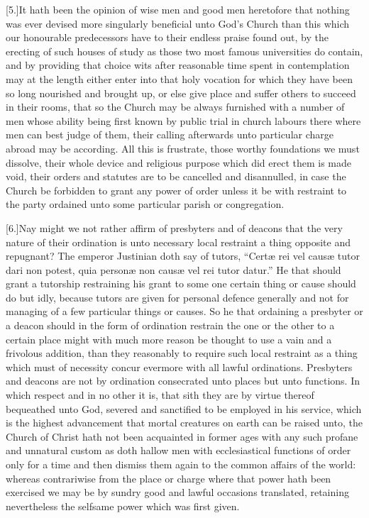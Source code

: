 [5.]It hath been the opinion of wise men and good men heretofore that nothing was ever devised more singularly beneficial unto God’s Church than this which our honourable predecessors have to their endless praise found out, by the erecting of such houses of study as those two most famous universities do contain, and by providing that choice wits after reasonable time spent in contemplation may at the length either enter into that holy vocation for which they have been so long nourished and brought up, or else give place and suffer others to succeed in their rooms, that so the Church may be always furnished with a number of men whose ability being first known by public trial in church labours there where men can best judge of them, their calling afterwards unto particular charge abroad may be according. All this is frustrate, those worthy foundations we must dissolve, their whole device and religious purpose which did erect them is made void, their orders and statutes are to be cancelled and disannulled, in case the Church be forbidden to grant any power of order unless it be with restraint to the party ordained unto some particular parish or congregation.

[6.]Nay might we not rather affirm of presbyters and of deacons that the very nature of their ordination is unto necessary local restraint a thing opposite and repugnant? The emperor Justinian doth say of tutors, “Certæ rei vel causæ tutor dari non potest, quia personæ non causæ vel rei tutor datur.” He that should grant a tutorship restraining his grant to some one certain thing or cause should do  but idly,
 because tutors are given for personal defence generally and not for managing of a few particular things or causes. So he that ordaining a presbyter or a deacon should in the form of ordination restrain the one or the other to a certain place might with much more reason be thought to use a vain and a frivolous addition, than they reasonably to require such local restraint as a thing which must of necessity concur evermore with all lawful ordinations. Presbyters and deacons are not by ordination consecrated unto places but unto functions. In which respect and in no other it is, that sith they are by virtue thereof bequeathed unto God, severed and sanctified to be employed in his service, which is the highest advancement that mortal creatures on earth can be raised unto, the Church of Christ hath not been acquainted in former ages with any such profane and unnatural custom as doth hallow men with ecclesiastical functions of order only for a time and then dismiss them again to the common affairs of the world: whereas contrariwise from the place or charge where that power hath been exercised we may be by sundry good and lawful occasions translated, retaining nevertheless the selfsame power which was first given.

